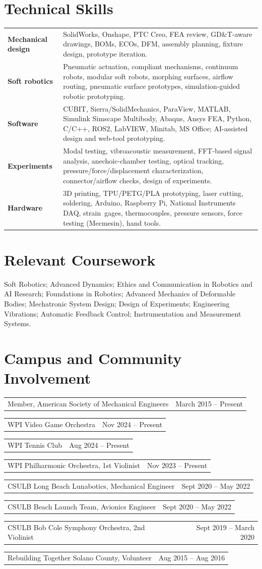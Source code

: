 \documentclass[10pt,letterpaper]{article}
\makeatletter
\newcommand{\datedline}[2]{%
  \begin{tabularx}{\textwidth}{@{}>{\raggedright\arraybackslash}X r@{}}
    #1 & #2
  \end{tabularx}
}
\makeatother
\begin{document}
\section*{Technical Skills}
\begin{tabularx}{\textwidth}{@{}>{\bfseries}p{} X@{}}
Mechanical design & SolidWorks, Onshape, PTC Creo, FEA review, GD\&T-aware drawings, BOMs, ECOs, DFM, assembly planning, fixture design, prototype iteration.\\
Soft robotics & Pneumatic actuation, compliant mechanisms, continuum robots, modular soft robots, morphing surfaces, airflow routing, pneumatic surface prototypes, simulation-guided robotic prototyping.\\
Software & CUBIT, Sierra/SolidMechanics, ParaView, MATLAB, Simulink Simscape Multibody, Abaqus, Ansys FEA, Python, C/C++, ROS2, LabVIEW, Minitab, MS Office; AI-assisted design and web-tool prototyping.\\
Experiments & Modal testing, vibroacoustic measurement, FFT-based signal analysis, anechoic-chamber testing, optical tracking, pressure/force/displacement characterization, connector/airflow checks, design of experiments.\\
Hardware & 3D printing, TPU/PETG/PLA prototyping, laser cutting, soldering, Arduino, Raspberry Pi, National Instruments DAQ, strain~gages, thermocouples, pressure sensors, force testing (Mecmesin), hand tools.\\
\end{tabularx}

\section*{Relevant Coursework}
Soft Robotics; Advanced Dynamics; Ethics and Communication in Robotics and AI Research; Foundations in Robotics; Advanced Mechanics of Deformable Bodies; Mechatronic System Design; Design of Experiments; Engineering Vibrations; Automatic Feedback Control; Instrumentation and Measurement Systems.

\section*{Campus and Community Involvement}
\datedline{Member, American Society of Mechanical Engineers}{March 2015 -- Present}
\datedline{WPI Video Game Orchestra}{Nov 2024 -- Present}
\datedline{WPI Tennis Club}{Aug 2024 -- Present}
\datedline{WPI Philharmonic Orchestra, 1st Violinist}{Nov 2023 -- Present}
\datedline{CSULB Long Beach Lunabotics, Mechanical Engineer}{Sept 2020 -- May 2022}
\datedline{CSULB Beach Launch Team, Avionics Engineer}{Sept 2020 -- May 2022}
\datedline{CSULB Bob Cole Symphony Orchestra, 2nd Violinist}{Sept 2019 -- March 2020}
\datedline{Rebuilding Together Solano County, Volunteer}{Aug 2015 -- Aug 2016}
\end{document}
